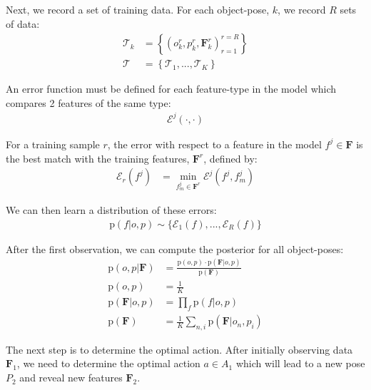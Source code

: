 \documentclass[11pt]{article}
\newcommand{\SetOf}[1]{\mathbf{#1}} %
\newcommand{\prob}[1]{\text{p}(#1)} %
\newcommand{\Eq}[1]{\begin{align*}#1\end{align*}} %
\newcommand{\cursive}[1]{\mathcal{#1}}
\begin{document}
	Next, we record a set of training data. For each object-pose, $k$, we record $R$ sets of data:
	\Eq{\cursive{T}_k &= \left\{\left(o^r_k,p^r_k,\SetOf{F}^r_k\right)^{r=R}_{r=1}\right\}\\ \cursive{T} &= \left\{\cursive{T}_1, ..., \cursive{T}_K \right\} }

	An error function must be defined for each feature-type in the model which compares 2 features of the same type:
	\Eq{\cursive{E}^j(\cdot,\cdot)}

	For a training sample $r$, the error with respect to a feature in the model $f^j \in \SetOf{F}$ is the best match with the training features, $\SetOf{F}^r$, defined by:
	\Eq{\cursive{E}_r(f^j) &= \min_{f^j_m \in \SetOf{F}^r}\cursive{E}^j(f^j,f^j_m)}

	We can then learn a distribution of these errors:
	\Eq{\prob{f|o,p} \sim \{\cursive{E}_1(f), ...,  \cursive{E}_R(f)\}}

	After the first observation, we can compute the posterior for all object-poses:
	\Eq{\prob{o,p|\SetOf{F}} &= \frac{\prob{o,p} \cdot \prob{\SetOf{F}|o,p}}{\prob{\SetOf{F}}}\\
	\prob{o,p} &= \frac{1}{K}\\
	\prob{\SetOf{F}|o,p} &= \prod_f \prob{f|o,p}\\
	\prob{\SetOf{F}} &= \frac{1}{K} \sum_{n,i} \prob{\SetOf{F}|o_n,p_i}}

	The next step is to determine the optimal action. After initially observing data $\SetOf{F}_1$, we need to determine the optimal action $a \in A_1$ which will lead to a new pose $P_2$ and reveal new features $\SetOf{F}_2$.
	\begin{center}
	\end{center}
\end{document}
